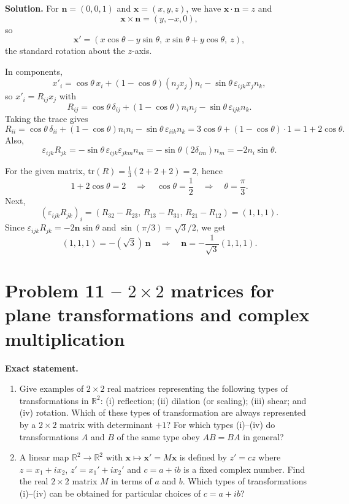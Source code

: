 \documentclass[12pt,a4paper]{article}
\theoremstyle{plain}
\theoremstyle{definition}      %
\begin{document}
\textbf{Solution.}
For $\mathbf n=(0,0,1)$ and $\mathbf x=(x,y,z)$, we have $\mathbf x\cdot\mathbf n=z$ and
\[
\mathbf x\times\mathbf n=(y,-x,0),
\]
so
\[
\mathbf x'=(x\cos\theta-y\sin\theta,\ x\sin\theta+y\cos\theta,\ z),
\]
the standard rotation about the $z$-axis.

In components,
\[
x'_i=\cos\theta\,x_i+(1-\cos\theta)(n_jx_j)n_i-\sin\theta\,\varepsilon_{ijk}x_jn_k,
\]
so $x'_i=R_{ij}x_j$ with
\[
R_{ij}=\cos\theta\,\delta_{ij}+(1-\cos\theta)n_in_j-\sin\theta\,\varepsilon_{ijk}n_k.
\]
Taking the trace gives
\[
R_{ii}=\cos\theta\,\delta_{ii}+(1-\cos\theta)n_in_i-\sin\theta\,\varepsilon_{iik}n_k
=3\cos\theta+(1-\cos\theta)\cdot 1
=1+2\cos\theta.
\]
Also,
\[
\varepsilon_{ijk}R_{jk}
=-\sin\theta\,\varepsilon_{ijk}\varepsilon_{jkm}n_m
=-\sin\theta\,(2\delta_{im})n_m
=-2n_i\sin\theta.
\]

For the given matrix, $\mathrm{tr}(R)=\frac13(2+2+2)=2$, hence
\[
1+2\cos\theta=2\quad\Rightarrow\quad \cos\theta=\frac12\quad\Rightarrow\quad \theta=\frac{\pi}{3}.
\]
Next,
\[
(\varepsilon_{ijk}R_{jk})_{i}=(R_{32}-R_{23},\,R_{13}-R_{31},\,R_{21}-R_{12})=(1,1,1).
\]
Since $\varepsilon_{ijk}R_{jk}=-2\mathbf n\sin\theta$ and $\sin(\pi/3)=\sqrt3/2$, we get
\[
(1,1,1)=-(\sqrt3)\,\mathbf n
\quad\Rightarrow\quad
\mathbf n=-\frac{1}{\sqrt3}(1,1,1).
\]

\section*{Problem 11 -- $2\times2$ matrices for plane transformations and complex multiplication}

\textbf{Exact statement.}
\begin{enumerate}[label=(\alph*)]
	\item Give examples of $2\times 2$ real matrices representing the following types of transformations in $\mathbb R^2$:
	(i) reflection; (ii) dilation (or scaling); (iii) shear; and (iv) rotation.
	Which of these types of transformation are always represented by a $2\times 2$ matrix with determinant $+1$?
	For which types (i)--(iv) do transformations $A$ and $B$ of the same type obey $AB=BA$ in general?
	\item A linear map $\mathbb R^2\to\mathbb R^2$ with $\mathbf x\mapsto \mathbf x'=M\mathbf x$ is defined by
	$z' = cz$ where $z=x_1+i x_2$, $z'=x_1'+i x_2'$ and $c=a+ib$ is a fixed complex number.
	Find the real $2\times 2$ matrix $M$ in terms of $a$ and $b$.
	Which types of transformations (i)--(iv) can be obtained for particular choices of $c=a+ib$?
\end{enumerate}
\end{document}
